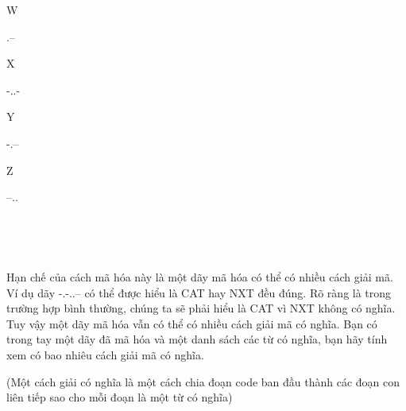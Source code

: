 W

.--

X

-..-

Y

-.--

Z

--..

 

 

Hạn chế của cách mã hóa này là một dãy mã hóa có thể có nhiều cách giải mã. Ví dụ dãy -.-..-- có thể được hiểu là CAT hay NXT đều đúng. Rõ ràng là trong trường hợp bình thường, chúng ta sẽ phải hiểu là CAT vì NXT không có nghĩa. Tuy vậy một dãy mã hóa vẫn có thể có nhiều cách giải mã có nghĩa. Bạn có trong tay một dãy đã mã hóa và một danh sách các từ có nghĩa, bạn hãy tính xem có bao nhiêu cách giải mã có nghĩa.

(Một cách giải có nghĩa là một cách chia đoạn code ban đầu thành các đoạn con liên tiếp sao cho mỗi đoạn là một từ có nghĩa)